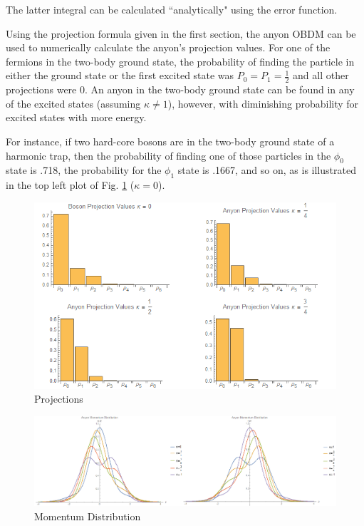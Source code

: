 \documentclass[onecolumn,english,aps,pra]{revtex4}
\begin{document}
The latter integral can be calculated ``analytically" using the error function. 

Using the projection formula given in the first section, the anyon OBDM can be used to numerically calculate the anyon's projection values. For one of the fermions in the two-body ground state, the probability of finding the particle in either the ground state or the first excited state was $P_{0} = P_{1} = \frac{1}{2}$ and all other projections were 0. An anyon in the two-body ground state can be found in any of the excited states (assuming $\kappa \neq 1$), however, with diminishing probability for excited states with more energy. 

For instance, if two hard-core bosons are in the two-body ground state of a harmonic trap, then the probability of finding one of those particles in the $\phi_0$ state is .718, the probability for the $\phi_1$ state is .1667, and so on, as is illustrated in the top left plot of Fig. \ref{fig:projections} ($\kappa = 0$).
\begin{figure}[h]
	\includegraphics[scale=.5]{"Plots/Anyon Projection Values"}
	\caption{Projections}
	\label{fig:projections}
\end{figure}
\begin{figure}[h]
\includegraphics[scale=.5]{"Plots/Momentum"}
\caption{Momentum Distribution}
\label{fig:momentum}
\end{figure}
\end{document}
